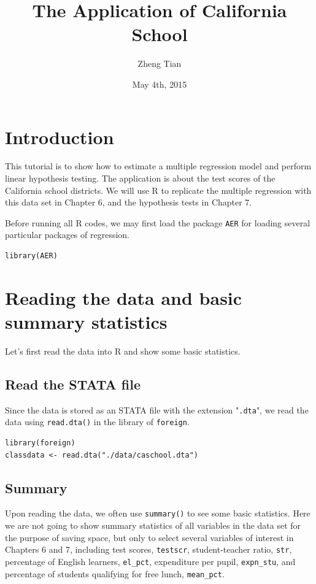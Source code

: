\documentclass[a4paper,11pt]{article}
\author{Zheng Tian}
\date{May 4th, 2015}
\title{The Application of California School}
\begin{document}
\maketitle

\section{Introduction}
\label{sec:orgc5629ad}
This tutorial is to show how to estimate a multiple regression model
and perform linear hypothesis testing. The application is about the
test scores of the California school districts. We will use R to
replicate the multiple regression with this data set in Chapter 6, and
the hypothesis tests in Chapter 7.

Before running all R codes, we may first load the package \texttt{AER} for loading several
particular packages of regression.
\begin{verbatim}
library(AER)
\end{verbatim}

\section{Reading the data and basic summary statistics}
\label{sec:org3cecd77}
Let's first read the data into R and show some basic statistics.
\subsection*{Read the STATA file}
\label{sec:org869fa7e}
Since the data is stored as an STATA file with the extension
  "\texttt{.dta}", we read the data using \texttt{read.dta()} in the library of
  \texttt{foreign}.

\begin{verbatim}
library(foreign)
classdata <- read.dta("./data/caschool.dta")
\end{verbatim}

\subsection*{Summary}
\label{sec:org71e5142}
Upon reading the data, we often use \texttt{summary()} to see some basic
statistics. Here we are not going to show summary statistics of all
variables in the data set for the purpose of saving space, but only to
select several variables of interest in Chapters 6 and 7, including
test scores, \texttt{testscr}, student-teacher ratio, \texttt{str}, percentage of
English learners, \texttt{el\_pct}, expenditure per pupil, \texttt{expn\_stu}, and
percentage of students qualifying for free lunch, \texttt{mean\_pct}.
\end{document}
